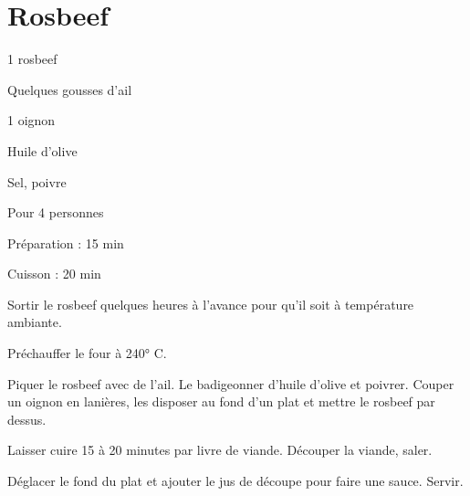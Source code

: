 \section[\normalsize{Rosbeef}]{Rosbeef}

\begin{ingredients}
\item 1 rosbeef
\item Quelques gousses d'ail
\item 1 oignon
\item Huile d'olive
\item Sel, poivre 
\end{ingredients}
\begin{infos}
\item Pour 4 personnes
\item Préparation : 15 min
\item Cuisson : 20 min
\end{infos}
\begin{etapes}
\item Sortir le rosbeef quelques heures \`a l'avance pour qu'il soit \`a temp\'erature ambiante.
\item Pr\'echauffer le four \`a 240° C.
\item Piquer le rosbeef avec de l'ail. Le badigeonner d'huile d'olive et poivrer. Couper un oignon en lani\`eres, les disposer au fond d'un plat et mettre le rosbeef par dessus.
\item Laisser cuire 15 \`a 20 minutes par livre de viande. D\'ecouper la viande, saler. 
\item D\'eglacer le fond du plat et ajouter le jus de d\'ecoupe pour faire une sauce. Servir.
\end{etapes}
\begin{conseils}
\end{conseils}